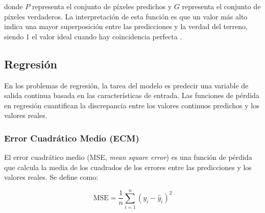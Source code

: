 donde \(P\) representa el conjunto de píxeles predichos y \(G\) representa el conjunto de píxeles verdaderos. La interpretación de esta función es que un valor más alto indica una mayor superposición entre las predicciones y la verdad del terreno, siendo 1 el valor ideal cuando hay coincidencia perfecta \cite{pajares2021aprendizaje}.

\subsection{Regresión}

En los problemas de regresión, la tarea del modelo es predecir una variable de salida continua basada en las características de entrada. Las funciones de pérdida en regresión cuantifican la discrepancia entre los valores continuos predichos y los valores reales.

\subsubsection{Error Cuadrático Medio (ECM)}

El error cuadrático medio (MSE, \textit{mean square error}) es una función de pérdida que calcula la media de los cuadrados de los errores entre las predicciones y los valores reales. Se define como:

\begin{equation}
    \text{MSE} = \frac{1}{n} \sum_{i=1}^{n} (y_i - \hat{y}_i)^2
\end{equation}

